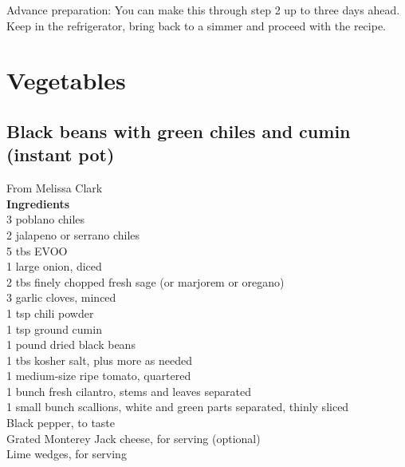 \documentclass{article}
\numberwithin{figure}{section}
\numberwithin{equation}{section}
\begin{document}
Advance preparation: You can make this through step 2 up to three days ahead. Keep in the refrigerator, bring back to a simmer and proceed with the recipe.


\pagebreak
\section{Vegetables}

\pagebreak
\subsection{Black beans with green chiles and cumin (instant pot)}
From Melissa Clark\\

{\bf Ingredients}\\
3 poblano chiles\\
2 jalapeno or serrano chiles\\
5 tbs EVOO\\
1 large onion, diced\\
2 tbs finely chopped fresh sage (or marjorem or oregano)\\
3 garlic cloves, minced\\
1 tsp chili powder\\
1 tsp ground cumin\\
1 pound dried black beans\\
1 tbs kosher salt, plus more as needed\\
1 medium-size ripe tomato, quartered\\
1 bunch fresh cilantro, stems and leaves separated\\
1 small bunch scallions, white and green parts separated, thinly sliced\\
Black pepper, to taste\\
Grated Monterey Jack cheese, for serving (optional)\\
Lime wedges, for serving\\
\end{document}

